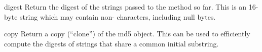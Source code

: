\begin{methoddesc}[md5]{digest}{}
Return the digest of the strings passed to the 
method so far.  This is an 16-byte string which may contain
non-\ASCII{} characters, including null bytes.
\end{methoddesc}

\begin{methoddesc}[md5]{copy}{}
Return a copy (``clone'') of the md5 object.  This can be used to
efficiently compute the digests of strings that share a common initial
substring.
\end{methoddesc}
